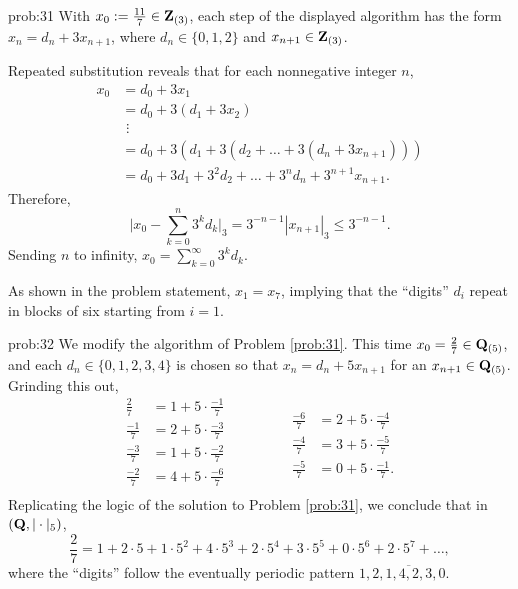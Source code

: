 \begin{sol}{prob:31} With $x_0:= \frac{11}{7} \in \mathbf{Z}_{(3)}$, each step of the displayed algorithm has the form $x_{n} = d_n + 3x_{n+1}$, where $d_n \in \{0,1,2\}$ and $x_{n+1} \in \mathbf{Z}_{(3)}$. 

Repeated substitution reveals that for each nonnegative integer $n$,
\begin{align*} x_0 &= d_0 + 3x_1 \\&= d_0 + 3(d_1 + 3x_2) \\&\,\,\vdots \\& = d_0 + 3(d_1 + 3(d_2 + \dots + 3(d_n + 3x_{n+1}))) \\&= d_0 + 3d_1 + 3^2 d_2 + \dots + 3^{n} d_n + 3^{n+1} x_{n+1}.\end{align*}
Therefore,
\[ \bigg|x_0 - \sum_{k=0}^{n} 3^k d_k\bigg|_3 = 3^{-n-1} |x_{n+1}|_3 \le 3^{-n-1}.\] Sending $n$ to infinity, $x_0 = \sum_{k=0}^{\infty} 3^k d_k$. 

As shown in the problem statement, $x_1=x_7$, implying that the ``digits'' $d_i$ repeat in blocks of six starting from $i=1$.
\end{sol}

\begin{sol}{prob:32} We modify the algorithm of Problem \ref{prob:31}. This time $x_0=\frac{2}{7} \in \mathbf{Q}_{(5)}$, and each $d_{n} \in \{0,1,2,3,4\}$ is chosen so that $x_{n} = d_n + 5 x_{n+1}$ for an $x_{n+1} \in \mathbf{Q}_{(5)}$. Grinding this out,
{\small\begin{equation*}
  \begin{split}
\frac{2}{7} &= 1 + 5\cdot \frac{-1}{7} \\
\frac{-1}{7} &= 2 + 5\cdot \frac{-3}{7} \\
\frac{-3}{7} &= 1 + 5\cdot \frac{-2}{7} \\
\frac{-2}{7} &= 4 + 5\cdot \frac{-6}{7} \\
  \end{split}\quad\quad\quad\quad
  \begin{split}
\frac{-6}{7} &= 2 + 5\cdot \frac{-4}{7} \\
\frac{-4}{7} &= 3 + 5\cdot \frac{-5}{7} \\
\frac{-5}{7} &= 0 + 5\cdot \frac{-1}{7}.
\end{split}
\end{equation*}}\normalsize Replicating the logic of the solution to Problem \ref{prob:31}, we conclude that in $(\mathbf{Q},|\cdot|_5)$, 
\[ \frac{2}{7} = 1 + 2\cdot 5 + 1\cdot 5^2 + 4\cdot 5^3 + 2\cdot 5^4 + 3 \cdot 5^5 + 0 \cdot 5^6 + 2\cdot 5^7 + \dots, \]
where the ``digits'' follow the eventually periodic pattern $1, \overline{2, 1, 4, 2, 3, 0}$.
\end{sol}

